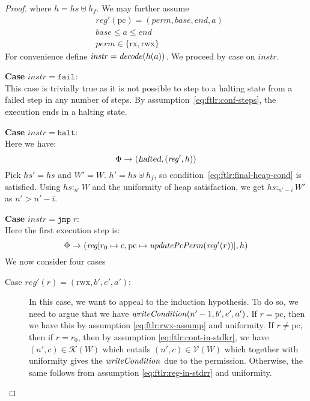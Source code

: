 \documentclass[a4paper]{article}
\newcommand{\var}[1]{\mathit{#1}}
\newcommand{\hs}{\var{hs}}
\newcommand{\pcreg}{\mathrm{pc}}
\newcommand{\addr}{\var{a}}
\newcommand{\start}{\var{base}}
\newcommand{\addrend}{\var{end}}
\newcommand{\reg}{\var{reg}}
\newcommand{\heap}{\var{heap}}
\newcommand{\perm}{\var{perm}}
\newcommand{\instr}{\var{instr}}
\newcommand{\halted}{\textsl{halted}}
\newcommand{\plainfun}[2]{
  \ifthenelse{\equal{#2}{}}
             {\mathit{#1}}
             {\mathit{#1}(#2)}
}
\newcommand{\decode}{\plainfun{decode}{}}
\newcommand{\updatePcPerm}[1]{\plainfun{updatePcPerm}{#1}}
\newcommand{\writeCond}[1]{\plainfun{writeCondition}{#1}}
\newcommand{\heapSat}[3][\heap]{#1 :_{#2} #3}
\newcommand{\asmType}{\plaindom{AsmType}}
\newcommand{\plaindom}[1]{\mathrm{#1}}
\newcommand{\intr}[2]{\mathcal{#1}}
\newcommand{\valueintr}[1]{\intr{V}{#1}}
\newcommand{\contintr}[1]{\intr{K}{#1}}
\newcommand{\stdvr}{\valueintr{\asmType}}
\newcommand{\stdkr}{\contintr{\asmType}}
\newcommand{\npair}[2][n]{\left(#1,#2 \right)}
\newcommand{\zinstr}[1]{\mathtt{#1}}
\newcommand{\fail}{\zinstr{fail}}
\newcommand{\halt}{\zinstr{halt}}
\newcommand{\oneinstr}[2]{\zinstr{#1} \; #2}
\newcommand{\jmp}[1]{\oneinstr{jmp}{#1}}
\newcommand{\plainperm}[1]{\mathrm{#1}}
\newcommand{\exec}{\plainperm{rx}}
\newcommand{\rwx}{\plainperm{rwx}}
\newcommand{\step}[1][]{\rightarrow_{#1}}
\begin{document}
\begin{proof}
where $h = \hs \uplus h_f$. We may further assume
\begin{align}
  &\reg'(\pcreg) = (\perm,\start,\addrend,\addr) \nonumber \\
  &\start \leq a \leq  \addrend \nonumber \\
  &\perm \in \{\exec,\rwx\} \nonumber
\end{align}
For convenience define $\instr = \decode(h(a))$. We proceed by case on $\instr$.
\newcommand{\case}[1]{{\bf Case } $\instr=#1$:\\}

\case{\fail} This case is trivially true as it is not possible to step to a halting state from a failed step in any number of steps. By assumption~\ref{eq:ftlr:conf-steps}, the execution ends in a halting state.

\case{\halt} 
Here we have:
\[
  \Phi \step (\halted, (\reg',h))
\]
Pick $\hs' = \hs$ and $W' = W$. $h' = \hs \uplus h_f$, so condition~\ref{eq:ftlr:final-heap-cond} is satisfied. Using $\heapSat[\hs]{n'}{W}$ and the uniformity of heap satisfaction, we get $\heapSat[\hs]{n'-i}{W'}$ as $n' > n'-i$.

\case{\jmp{r}}
Here the first execution step is:
\[
  \Phi \step (\reg[r_0 \mapsto c, \pcreg \mapsto \updatePcPerm{\reg'(r)}],h)
\]
We now consider four cases 
\begin{description}
\item[Case $\reg'(r) = (\rwx,b',e',a')$:] In this case, we want to appeal to the induction hypothesis. To do so, we need to argue that we have $\writeCond{n'-1,b',e',a'}$. If $r=\pcreg$, then we have this by assumption \ref{eq:ftlr:rwx-assump} and uniformity. If $r \neq \pcreg$, then if $r= r_0$, then by assumption \ref{eq:ftlr:cont-in-stdkr}, we have $\npair[n']{c} \in \stdkr(W)$ which entails $\npair[n']{c} \in \stdvr(W)$ which together with uniformity gives the $\writeCond{}$ due to the permission. Otherwise, the same follows from assumption \ref{eq:ftlr:reg-in-stdrr} and uniformity.


\end{description}
\end{proof}
\end{document}

